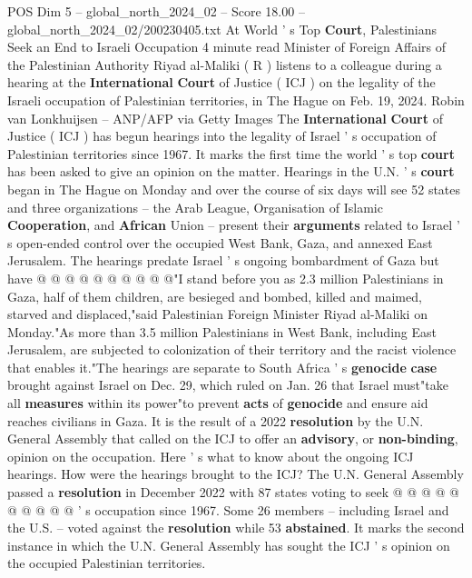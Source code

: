 \begin{textsample}{POS Dim 5 – global\_north\_2024\_02 – Score 18.00 – global\_north\_2024\_02/200230405.txt}  \label{ex:f5_pos_246}
At World ' s Top \textbf{Court}, Palestinians Seek an End to Israeli Occupation 4 minute read Minister of Foreign Affairs of the Palestinian Authority Riyad al-Maliki ( R ) listens to a colleague during a hearing at the \textbf{International} \textbf{Court} of Justice ( ICJ ) on the legality of the Israeli occupation of Palestinian territories, in The Hague on Feb. 19, 2024.
Robin van Lonkhuijsen -- ANP/AFP via Getty Images The \textbf{International} \textbf{Court} of Justice ( ICJ ) has begun hearings into the legality of Israel ' s occupation of Palestinian territories since 1967.
It marks the first time the world ' s top \textbf{court} has been asked to give an opinion on the matter.
Hearings in the U.N. ' s \textbf{court} began in The Hague on Monday and over the course of six days will see 52 states and three organizations -- the Arab League, Organisation of Islamic \textbf{Cooperation}, and \textbf{African} Union -- present their \textbf{arguments} related to Israel ' s open-ended control over the occupied West Bank, Gaza, and annexed East Jerusalem.
The hearings predate Israel ' s ongoing bombardment of Gaza but have @ @ @ @ @ @ @ @ @ @"I stand before you as 2.3 million Palestinians in Gaza, half of them children, are besieged and bombed, killed and maimed, starved and displaced,"said Palestinian Foreign Minister Riyad al-Maliki on Monday."As more than 3.5 million Palestinians in West Bank, including East Jerusalem, are subjected to colonization of their territory and the racist violence that enables it."The hearings are separate to South Africa ' s \textbf{genocide} \textbf{case} brought against Israel on Dec. 29, which ruled on Jan. 26 that Israel must"take all \textbf{measures} within its power"to prevent \textbf{acts} of \textbf{genocide} and ensure aid reaches civilians in Gaza.
It is the result of a 2022 \textbf{resolution} by the U.N.
General Assembly that called on the ICJ to offer an \textbf{advisory}, or \textbf{non-binding}, opinion on the occupation.
Here ' s what to know about the ongoing ICJ hearings.
How were the hearings brought to the ICJ?
The U.N.
General Assembly passed a \textbf{resolution} in December 2022 with 87 states voting to seek @ @ @ @ @ @ @ @ @ @ ' s occupation since 1967.
Some 26 members -- including Israel and the U.S. -- voted against the \textbf{resolution} while 53 \textbf{abstained}.
It marks the second instance in which the U.N.
General Assembly has sought the ICJ ' s opinion on the occupied Palestinian territories.

\end{textsample}
